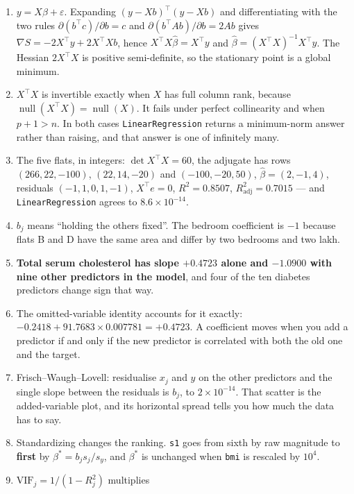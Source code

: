 \documentclass[11pt]{article}
\newcommand{\Xt}{X^{\!\top}}
\begin{document}
\begin{enumerate}[leftmargin=*]
  \item $y = X\beta + \varepsilon$. Expanding $(y-Xb)^{\!\top}(y-Xb)$ and
    differentiating with the two rules
    $\partial(b^{\!\top}c)/\partial b = c$ and
    $\partial(b^{\!\top}Ab)/\partial b = 2Ab$ gives
    $\nabla S = -2\Xt y + 2\Xt X b$, hence $\Xt X\hat\beta = \Xt y$ and
    $\hat\beta = (\Xt X)^{-1}\Xt y$. The Hessian $2\Xt X$ is positive
    semi-definite, so the stationary point is a global minimum.
  \item $\Xt X$ is invertible exactly when $X$ has full column rank, because
    $\operatorname{null}(\Xt X) = \operatorname{null}(X)$. It fails under
    perfect collinearity and when $p+1 > n$. In both cases
    \texttt{LinearRegression} returns a minimum-norm answer rather than
    raising, and that answer is one of infinitely many.
  \item The five flats, in integers: $\det \Xt X = 60$, the adjugate has rows
    $(266, 22, -100)$, $(22, 14, -20)$ and $(-100, -20, 50)$,
    $\hat\beta = (2,-1,4)$, residuals $(-1,1,0,1,-1)$, $\Xt e = 0$,
    $R^2 = 0.8507$, $R^2_{\text{adj}} = 0.7015$ --- and
    \texttt{LinearRegression} agrees to $8.6\times10^{-14}$.
  \item $b_j$ means ``holding the others fixed''. The bedroom coefficient is
    $-1$ because flats B and D have the same area and differ by two bedrooms
    and two lakh.
  \item \textbf{Total serum cholesterol has slope $+0.4723$ alone and
    $-1.0900$ with nine other predictors in the model}, and four of the ten
    diabetes predictors change sign that way.
  \item The omitted-variable identity accounts for it exactly:
    $-0.2418 + 91.7683\times0.007781 = +0.4723$. A coefficient moves when you
    add a predictor if and only if the new predictor is correlated with both
    the old one and the target.
  \item Frisch--Waugh--Lovell: residualise $x_j$ and $y$ on the other
    predictors and the single slope between the residuals is $b_j$, to
    $2\times10^{-14}$. That scatter is the added-variable plot, and its
    horizontal spread tells you how much the data has to say.
  \item Standardizing changes the ranking. \texttt{s1} goes from sixth by raw
    magnitude to \textbf{first} by $\beta^* = b_j s_j/s_y$, and $\beta^*$ is
    unchanged when \texttt{bmi} is rescaled by $10^4$.
  \item $\mathrm{VIF}_j = 1/(1-R_j^2)$ multiplies

\end{enumerate}
\end{document}
